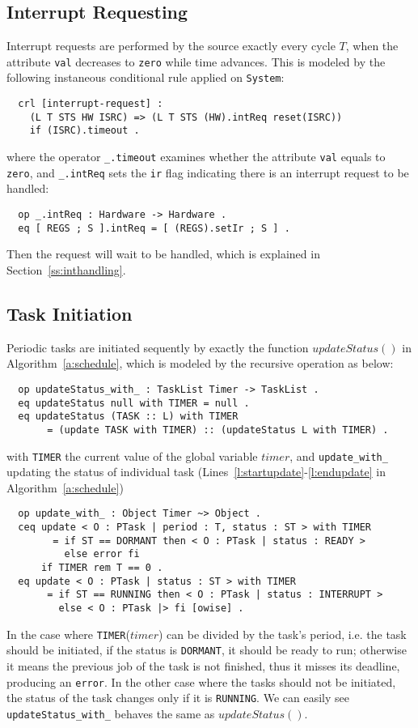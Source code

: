\documentclass{llncs}
\begin{document}
\subsection{Interrupt Requesting}
Interrupt requests are performed by the source exactly every cycle
$T$, when the attribute \verb|val| decreases to \verb|zero| while time
advances. This is modeled by the following instaneous conditional rule
applied on \verb|System|:
\begin{verbatim}
  crl [interrupt-request] :
    (L T STS HW ISRC) => (L T STS (HW).intReq reset(ISRC))
    if (ISRC).timeout .
\end{verbatim}
where the operator \verb|_.timeout| examines whether the attribute
\verb|val| equals to \verb|zero|, and \verb|_.intReq| sets the
\verb|ir| flag indicating there is an interrupt request to be handled:
\begin{verbatim}
  op _.intReq : Hardware -> Hardware .
  eq [ REGS ; S ].intReq = [ (REGS).setIr ; S ] .
\end{verbatim}
Then the request will wait to be handled, which is explained in
Section~\ref{ss:inthandling}.


\subsection{Task Initiation}
Periodic tasks are initiated sequently by exactly the function
$updateStatus()$ in Algorithm~\ref{a:schedule}, which is modeled by
the recursive operation as below:
\begin{verbatim}
  op updateStatus_with_ : TaskList Timer -> TaskList . 
  eq updateStatus null with TIMER = null .
  eq updateStatus (TASK :: L) with TIMER
       = (update TASK with TIMER) :: (updateStatus L with TIMER) .
\end{verbatim}
with \verb|TIMER| the current value of the global variable $timer$,
and \verb|update_with_| updating the status of individual task
(Lines~\ref{l:startupdate}-\ref{l:endupdate} in
Algorithm~\ref{a:schedule})
\begin{verbatim}
  op update_with_ : Object Timer ~> Object .
  ceq update < O : PTask | period : T, status : ST > with TIMER
        = if ST == DORMANT then < O : PTask | status : READY >
          else error fi
      if TIMER rem T == 0 .
  eq update < O : PTask | status : ST > with TIMER
       = if ST == RUNNING then < O : PTask | status : INTERRUPT >
         else < O : PTask |> fi [owise] .
\end{verbatim}
In the case where \verb|TIMER|($timer$) can be divided by the task's
period, i.e. the task should be initiated, if the status is
\verb|DORMANT|, it should be ready to run; otherwise it means the
previous job of the task is not finished, thus it misses its deadline,
producing an \verb|error|. In the other case where the tasks should
not be initiated, the status of the task changes only if it is
\verb|RUNNING|. We can easily see \verb|updateStatus_with_| behaves
the same as $updateStatus()$.
\end{document}
